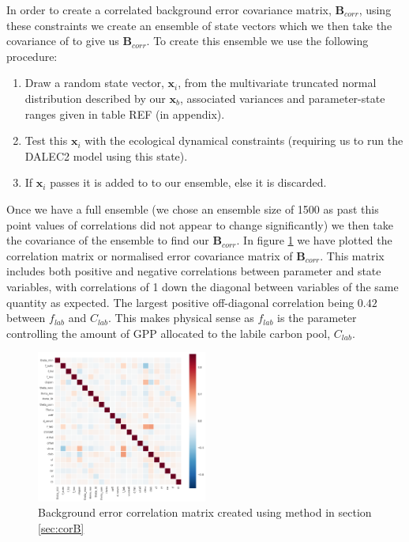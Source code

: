 \documentclass[11pt]{article}
\begin{document}
In order to create a correlated background error covariance matrix, $\textbf{B}_{corr}$, using these constraints we create an ensemble of state vectors which we then take the covariance of to give us $\textbf{B}_{corr}$. To create this ensemble we use the following procedure:
\begin{enumerate}
\item Draw a random state vector, $\textbf{x}_i$, from the multivariate truncated normal distribution described by our $\textbf{x}_b$, associated variances and parameter-state ranges given in table REF (in appendix).
\item Test this $\textbf{x}_i$ with the ecological dynamical constraints (requiring us to run the DALEC2 model using this state).
\item If $\textbf{x}_i$ passes it is added to to our ensemble, else it is discarded.
\end{enumerate}
Once we have a full ensemble (we chose an ensemble size of 1500 as past this point values of correlations did not appear to change significantly) we then take the covariance of the ensemble to find our $\textbf{B}_{corr}$. In figure \ref{fig:Bcorr} we have plotted the correlation matrix or normalised error covariance matrix of $\textbf{B}_{corr}$. This matrix includes both positive and negative correlations between parameter and state variables, with correlations of 1 down the diagonal between variables of the same quantity as expected. The largest positive off-diagonal correlation being $0.42$ between $f_{lab}$ and $C_{lab}$. This makes physical sense as $f_{lab}$ is the parameter controlling the amount of GPP allocated to the labile carbon pool, $C_{lab}$.

\begin{figure}[ht]
    \centering
    \includegraphics[width=0.5\textwidth]{b_edcNone_corrmat.png}
    \caption{Background error correlation matrix created using method in section \ref{sec:corB}}
    \label{fig:Bcorr}
\end{figure}
\end{document}
